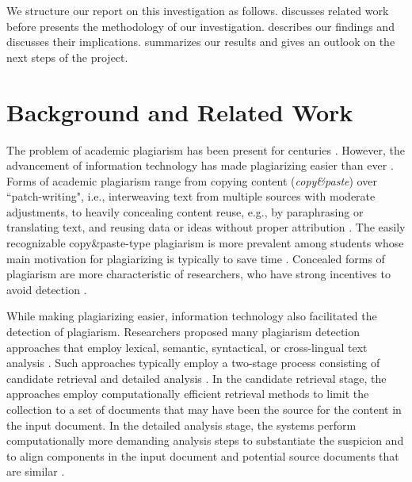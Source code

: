 \documentclass{llncs}
\begin{document}
We structure our report on this investigation as follows.
 discusses related work before  presents the methodology of our investigation.  describes our findings and discusses their implications.  summarizes our results and gives an outlook on the next steps of the project.

\section{Background and Related Work}\label{sec.background}
The problem of academic plagiarism has been present for centuries \cite{Weber-Wulff2014}. However, the advancement of information technology has made plagiarizing easier than ever \cite{Foltynek2019}. Forms of academic plagiarism range from copying content (\textit{copy\&paste}) over ``patch-writing", i.e., interweaving text from multiple sources with moderate adjustments, to heavily concealing content reuse, e.g., by paraphrasing or translating text, and reusing data or ideas without proper attribution \cite{Weber-Wulff2014}. The easily recognizable copy\&paste-type plagiarism is more prevalent among students whose main motivation for plagiarizing is typically to save time \cite{McCabe05}. Concealed forms of plagiarism are more characteristic of researchers, who have strong incentives to avoid detection \cite{Alzahrani2012}.

While making plagiarizing easier, information technology also facilitated the detection of plagiarism. Researchers proposed many plagiarism detection approaches that employ lexical, semantic, syntactical, or cross-lingual text analysis \cite{Meuschke13,Eisa2015,Gupta2016}. Such approaches typically employ a two-stage process consisting of candidate retrieval and detailed analysis \cite{Stein2007a,Meuschke13}. In the candidate retrieval stage, the approaches employ computationally efficient retrieval methods to limit the collection to a set of documents that may have been the source for the content in the input document. In the detailed analysis stage, the systems perform computationally more demanding analysis steps to substantiate the suspicion and to align components in the input document and potential source documents that are similar \cite{Meuschke13, Alzahrani2012, Foltynek2019}.
\end{document}

